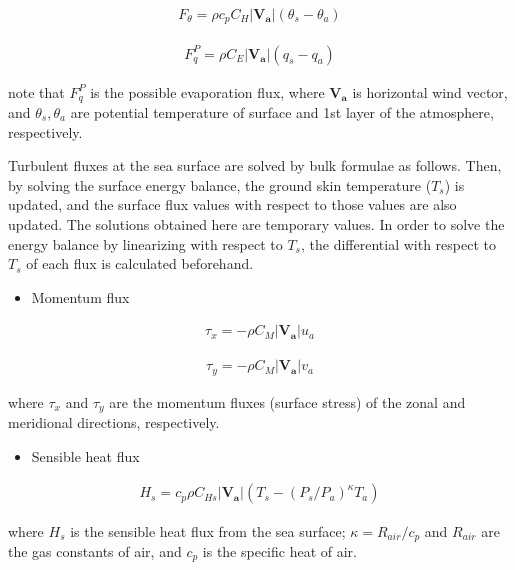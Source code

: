 \begin{eqnarray}
    F_\theta  = \rho c_p C_H |\mathbf{V_a}| ( \theta_s - \theta_a )
\end{eqnarray}

\begin{eqnarray}
    F_q^P =  \rho C_E |\mathbf{V_a}| ( q_s - q_a )
\end{eqnarray}

note that \(F_q^P\) is the possible evaporation flux, where
\(\mathbf{V_a}\) is horizontal wind vector, and \(\theta_s, \theta_a\)
are potential temperature of surface and 1st layer of the atmosphere,
respectively.

Turbulent fluxes at the sea surface are solved by bulk formulae as
follows. Then, by solving the surface energy balance, the ground skin
temperature (\(T_s\)) is updated, and the surface flux values with
respect to those values are also updated. The solutions obtained here
are temporary values. In order to solve the energy balance by
linearizing with respect to \(T_s\), the differential with respect to
\(T_s\) of each flux is calculated beforehand.

\begin{itemize}
\tightlist
\item
  Momentum flux
\end{itemize}

\begin{eqnarray}
 \tau_x = - \rho C_{M}|\mathbf{V_a}| u_a
\end{eqnarray}

\begin{eqnarray}
 \tau_y = - \rho C_{M}|\mathbf{V_a}| v_a
\end{eqnarray}

where \(\tau_x\) and \(\tau_y\) are the momentum fluxes (surface stress)
of the zonal and meridional directions, respectively.

\begin{itemize}
\tightlist
\item
  Sensible heat flux
\end{itemize}

\begin{eqnarray}
 H_s = c_p \rho C_{Hs}|\mathbf{V_a}| (T_s - (P_s/P_a)^{\kappa}T_a)
\end{eqnarray}

where \(H_s\) is the sensible heat flux from the sea surface;
\(\kappa = R_{air} / c_p\) and \(R_{air}\) are the gas constants of air,
and \(c_p\) is the specific heat of air.

